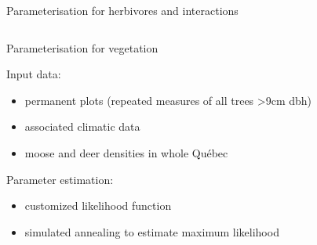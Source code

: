 \documentclass[10pt,aspectratio=149]{beamer}
\begin{document}
\begin{frame}{Parameterisation for herbivores and interactions}
\begin{columns}
\begin{column}{0.65\textwidth}
{}

\end{column}
\end{columns}

\end{frame}


\begin{frame}{Parameterisation for vegetation}

Input data: 
\begin{itemize}
\item permanent plots (repeated measures of all trees >9cm dbh)
\item associated climatic data
\item moose and deer densities in whole Québec
\end{itemize}

\vspace{1em}

Parameter estimation:
\begin{itemize}
\item customized \alert{likelihood function}
\item \alert{simulated annealing} to estimate maximum likelihood
\end{itemize}

\end{frame}
\end{document}
